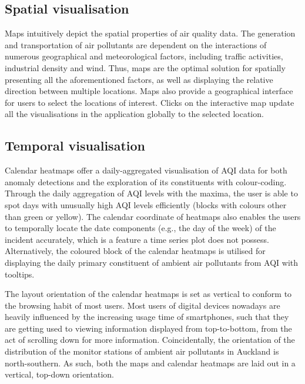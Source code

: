 \documentclass{aucklandthesis}
\begin{document}
\hypertarget{spatial-visualisation}{%
\subsection{Spatial visualisation}\label{spatial-visualisation}}

Maps intuitively depict the spatial properties of air quality data. The generation and transportation of air pollutants are dependent on the interactions of numerous geographical and meteorological factors, including traffic activities, industrial density and wind. Thus, maps are the optimal solution for spatially presenting all the aforementioned factors, as well as displaying the relative direction between multiple locations. Maps also provide a geographical interface for users to select the locations of interest. Clicks on the interactive map update all the visualisations in the application globally to the selected location.

\hypertarget{temporal-visualisation}{%
\subsection{Temporal visualisation}\label{temporal-visualisation}}

Calendar heatmaps offer a daily-aggregated visualisation of AQI data for both anomaly detections and the exploration of its constituents with colour-coding. Through the daily aggregation of AQI levels with the maxima, the user is able to spot days with unusually high AQI levels efficiently (blocks with colours other than green or yellow). The calendar coordinate of heatmaps also enables the users to temporally locate the date components (e.g., the day of the week) of the incident accurately, which is a feature a time series plot does not possess. Alternatively, the coloured block of the calendar heatmaps is utilised for displaying the daily primary constituent of ambient air pollutants from AQI with tooltips.

The layout orientation of the calendar heatmaps is set as vertical to conform to the browsing habit of most users. Most users of digital devices nowadays are heavily influenced by the increasing usage time of smartphones, such that they are getting used to viewing information displayed from top-to-bottom, from the act of scrolling down for more information. Coincidentally, the orientation of the distribution of the monitor stations of ambient air pollutants in Auckland is north-southern. As such, both the maps and calendar heatmaps are laid out in a vertical, top-down orientation.
\end{document}
